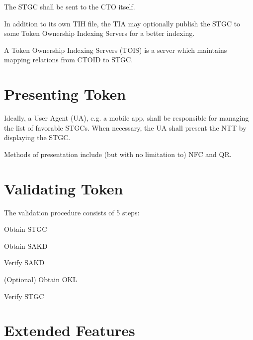 The STGC shall be sent to the CTO itself.

In addition to its own TIH file, the TIA may optionally publish the STGC to some Token Ownership Indexing Servers for a better indexing.

A Token Ownership Indexing Servers (TOIS) is a server which maintains mapping relations from CTOID to STGC.









\section{Presenting Token}

Ideally, a User Agent (UA), e.g. a mobile app, shall be responsible for managing the list of favorable STGCs.
When necessary, the UA shall present the NTT by displaying the STGC.

Methods of presentation include (but with no limitation to) NFC and QR.












\section{Validating Token}

The validation procedure consists of 5 steps:

\begin{compactenum}
    \item Obtain STGC
    \item Obtain SAKD
    \item Verify SAKD
    \item (Optional) Obtain OKL
    \item Verify STGC
\end{compactenum}











\section{Extended Features}



